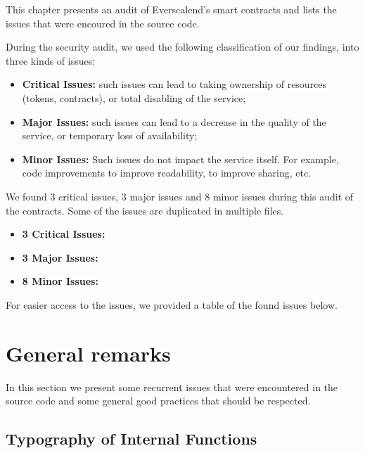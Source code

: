 


\noindent This chapter presents an audit of Everscalend's smart contracts and lists the issues that were encoured in the source code.

During the security audit, we used the following classification of our findings, into three kinds of issues:

\begin{itemize}
  \item {\bf Critical Issues:} such issues can lead to taking ownership of resources (tokens, contracts), or total disabling of the service;
  \item {\bf Major Issues:} such issues can lead to a decrease in the quality of the service, or temporary loss of availability;
  \item {\bf Minor Issues:} Such issues do not impact the service itself. For example, code improvements to improve readability, to improve sharing, etc.
\end{itemize}

We found 3 critical issues, 3 major issues and 8 minor issues during this audit of the contracts. Some of the issues are duplicated in multiple files.

\begin{itemize}
\item {\bf 3 Critical Issues:}
\item {\bf 3 Major Issues:}
\item {\bf 8 Minor Issues:}
\end{itemize}

For easier access to the issues, we provided a table of the found issues below.


\begingroup
  \pagestyle{plain}
  \begin{figure}[hbt!]
    \listoffigures
  \end{figure}
\endgroup


\section{General remarks}

In this section we present some recurrent issues that were encountered in the source code and some general good practices that should be respected. 

\subsection{Typography of Internal Functions}
\label{readability:internal}

